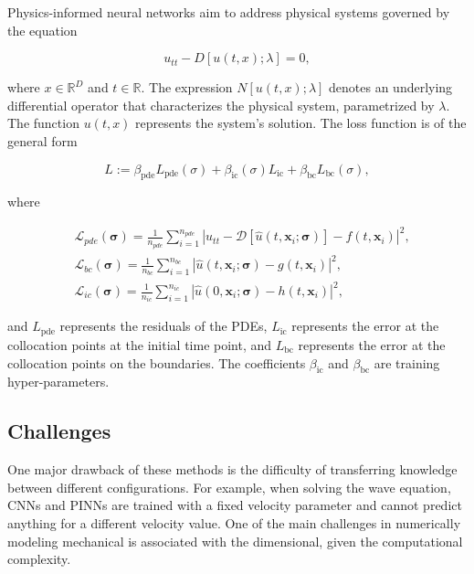 \documentclass[11pt,twoside]{article}
\begin{document}
Physics-informed neural networks aim to address physical systems governed by the equation

$$
u_{tt} - D[u(t, x); \lambda] = 0,
$$

where \(x \in \mathbb{R}^D\) and \(t \in \mathbb{R}\). The expression \(N[u(t, x); \lambda]\) denotes an underlying differential operator 
that characterizes the physical system, parametrized by \(\lambda\). The function \(u(t, x)\) represents the system's solution. The loss 
function is of the general form 

$$ L := \beta_{\text{pde}}L_{\text{pde}}(\sigma) + \beta_{\text{ic}}(\sigma) L_{\text{ic}} + \beta_{\text{bc}} L_{\text{bc}}(\sigma) ,$$

where

$$
\begin{aligned}
& \mathcal{L}_{pde}(\boldsymbol{\sigma})=\frac{1}{n_{pde}} \sum_{i=1}^{n_{pde}}\left|u_{tt} - \mathcal{D}\left[\hat{u}\left(t,
 \boldsymbol{x}_i ; \boldsymbol{\sigma}\right)\right]-f\left(t, \boldsymbol{x}_i\right)\right|^2, \\
& \mathcal{L}_{bc}(\boldsymbol{\sigma})=\frac{1}{n_{bc}} \sum_{i=1}^{n_{bc}}\left|\hat{u}\left(t, \boldsymbol{x}_i ;
 \boldsymbol{\sigma}\right)-g\left(t, \boldsymbol{x}_i\right)\right|^2, \\
& \mathcal{L}_{ic}(\boldsymbol{\sigma})=\frac{1}{n_{ic}} \sum_{i=1}^{n_{ic}}\left|\hat{u}\left(0, \boldsymbol{x}_i ;
 \boldsymbol{\sigma}\right)-h\left(t,\boldsymbol{x}_i\right)\right|^2,
\end{aligned}
$$

and \( L_{\text{pde}} \) represents the residuals of the PDEs, \( L_{\text{ic}} \) represents the error at the collocation points at the 
initial time point, and \( L_{\text{bc}} \) represents the error at the collocation points on the boundaries. The coefficients 
\(\beta_{\text{ic}}\) and \(\beta_{\text{bc}}\) are training hyper-parameters.

\subsection{Challenges}

One major drawback of these methods is the difficulty of transferring knowledge between different configurations. For example, when solving 
the wave equation, CNNs and PINNs are trained with a fixed velocity parameter and cannot predict anything for a different velocity value. 
One of the main challenges in numerically modeling mechanical is associated with the dimensional, given the computational complexity.
\end{document}
